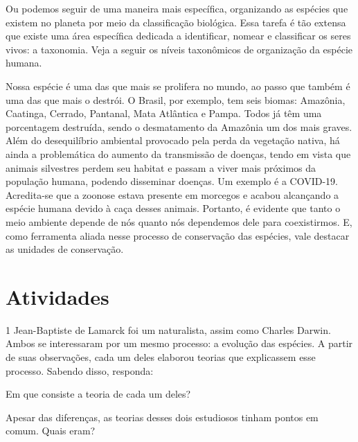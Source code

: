 {Ou podemos seguir de uma maneira mais específica, organizando as
espécies que existem no planeta por meio da classificação biológica.
Essa tarefa é tão extensa que existe uma área específica dedicada a
identificar, nomear e classificar os seres vivos: a taxonomia. Veja a
seguir os níveis taxonômicos de organização da espécie humana.

Nossa espécie é uma das que mais se prolifera no mundo, ao passo que
também é uma das que mais o destrói. O Brasil, por exemplo, tem seis biomas: Amazônia, Caatinga, Cerrado, Pantanal, Mata Atlântica e Pampa. Todos
já têm uma porcentagem destruída, sendo o desmatamento da Amazônia um
dos mais graves. Além do desequilíbrio ambiental provocado pela perda da
vegetação nativa, há ainda a problemática do aumento da transmissão de
doenças, tendo em vista que animais silvestres perdem seu habitat e
passam a viver mais próximos da população humana, podendo disseminar
doenças. Um exemplo é a COVID-19. Acredita-se que a zoonose estava
presente em morcegos e acabou alcançando a espécie humana devido à caça
desses animais. Portanto, é evidente que tanto o meio ambiente depende
de nós quanto nós dependemos dele para coexistirmos. E, como ferramenta
aliada nesse processo de conservação das espécies, vale destacar as
unidades de conservação.}

\section{Atividades}

\num{1} Jean-Baptiste de Lamarck foi um naturalista, assim como Charles
  Darwin. Ambos se interessaram por um mesmo processo: a evolução das
  espécies. A partir de suas observações, cada um deles elaborou teorias
  que explicassem esse processo. Sabendo disso, responda:

\begin{escolha}
\item Em que consiste a teoria de cada um deles?\\

\item Apesar das diferenças, as teorias desses dois estudiosos tinham pontos em comum. Quais eram?\\
\end{escolha}

